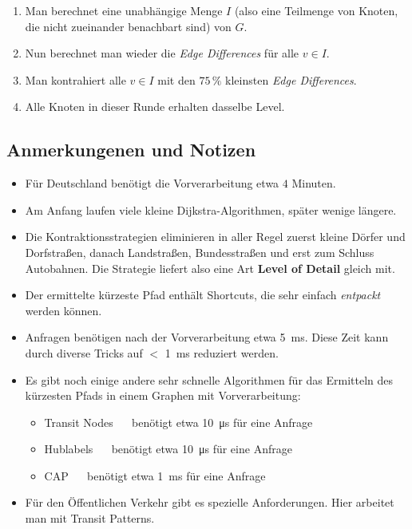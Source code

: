 \documentclass{scrartcl}%
\begin{document}
    \begin{enumerate}
        \item Man berechnet eine unabhängige Menge $I$ (also eine Teilmenge von Knoten, die nicht zueinander benachbart sind) von $G$.
        \item Nun berechnet man wieder die \textit{Edge Differences} für alle $v \in I$.
        \item Man kontrahiert alle $v \in I$ mit den $75\, \%$ kleinsten \textit{Edge Differences}.
        \item Alle Knoten in dieser Runde erhalten dasselbe Level.
    \end{enumerate}

    \subsection*{Anmerkungenen und Notizen}\label{subsec:notizenZurContractionHierarchie}
    \begin{itemize}
        \item Für Deutschland benötigt die Vorverarbeitung etwa $4$ Minuten.
        \item Am Anfang laufen viele kleine Dijkstra-Algorithmen, später wenige längere.
        \item Die Kontraktionsstrategien eliminieren in aller Regel zuerst kleine Dörfer und Dorfstraßen,
        danach Landstraßen, Bundesstraßen und erst zum Schluss Autobahnen. Die Strategie liefert also eine Art \textbf{\textsf{Level of Detail}} gleich mit.
        \item Der ermittelte kürzeste Pfad enthält Shortcuts, die sehr einfach \textit{entpackt} werden können.
        \item Anfragen benötigen nach der Vorverarbeitung etwa \SI{5}{\ms}. Diese Zeit kann durch diverse Tricks auf $<$ \SI{1}{\ms} reduziert werden.
        \item Es gibt noch einige andere sehr schnelle Algorithmen für das Ermitteln des kürzesten Pfads in einem Graphen mit Vorverarbeitung:
        \begin{itemize}
            \item \textsf{Transit Nodes} $\quad$ benötigt etwa \SI{10}{\micro\s} für eine Anfrage
            \item \textsf{Hublabels} $\quad$ benötigt etwa \SI{10}{\micro\s} für eine Anfrage
            \item \textsf{CAP} $\quad$ benötigt etwa \SI{1}{\ms} für eine Anfrage
        \end{itemize}
        \item Für den Öffentlichen Verkehr gibt es spezielle Anforderungen. Hier arbeitet man mit Transit Patterns.
    \end{itemize}
\end{document}
